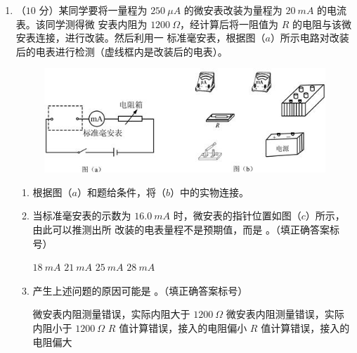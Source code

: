 \begin{enumerate}
\newpage
\item 
（$ 10 $ 分）某同学要将一量程为 $ 250 \ \mu A $ 的微安表改装为量程为 $ 20 \ mA $ 的电流表。该同学测得微
安表内阻为 $ 1200 \ \Omega $，经计算后将一阻值为 $ R $ 的电阻与该微安表连接，进行改装。然后利用一
标准毫安表，根据图（$ a $）所示电路对改装后的电表进行检测（虚线框内是改装后的电表）。
\begin{figure}[h!]
\centering
\includegraphics[width=0.83\linewidth]{picture/screenshot019}
\end{figure}


\begin{enumerate}
\renewcommand{\labelenumi}{\arabic{enumi}.}
\item
根据图（$ a $）和题给条件，将（$ b $）中的实物连接。





\item 
当标准毫安表的示数为 $ 16.0 \ mA $ 时，微安表的指针位置如图（$ c $）所示，由此可以推测出所
改装的电表量程不是预期值，而是 \underlinegap 。（填正确答案标号）
\begin{figure}[h!]
\centering

\end{figure}

\fourchoices
{$ 18 \ mA $}
{$ 21 \ mA $}
{$ 25 \ mA $}
{$ 28 \ mA $}




\item 
产生上述问题的原因可能是 \underlinegap 。（填正确答案标号）

\fourchoices
{微安表内阻测量错误，实际内阻大于 $ 1200 \ \Omega $}
{微安表内阻测量错误，实际内阻小于 $ 1200 \ \Omega $}
{$ R $ 值计算错误，接入的电阻偏小}
{$ R $ 值计算错误，接入的电阻偏大}




\end{enumerate}
\end{enumerate}
